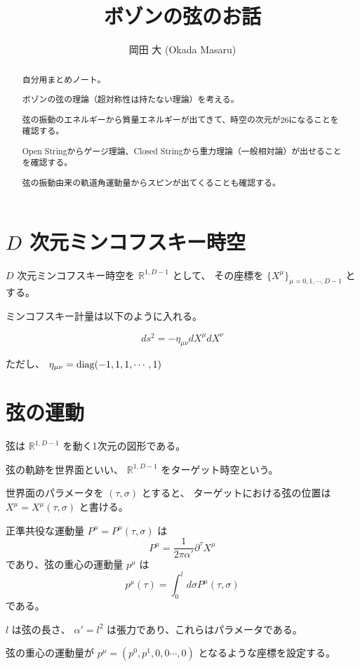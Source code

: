 \documentclass[uplatex]{jsarticle}
\title{
ボゾンの弦のお話
}
\author{
岡田 大 (Okada Masaru)
}
\begin{document}
\maketitle

\begin{abstract}
	自分用まとめノート。

	ボゾンの弦の理論（超対称性は持たない理論）を考える。

	弦の振動のエネルギーから質量エネルギーが出てきて、時空の次元が26になることを確認する。

	Open Stringからゲージ理論、Closed Stringから重力理論（一般相対論）が出せることを確認する。

	弦の振動由来の軌道角運動量からスピンが出てくることも確認する。

\end{abstract}

\section{$D$ 次元ミンコフスキー時空}

$D$ 次元ミンコフスキー時空を
$\mathbb{R}^{1,D-1}$
として、
その座標を
$\{ X^{\mu} \}_{\mu=0,1,\cdots,D-1}$
とする。

ミンコフスキー計量は以下のように入れる。

$$
	ds^{2} = - \eta_{\mu \nu} dX^{\mu} dX^{\nu}
$$


ただし、
$\eta_{\mu \nu} = {\rm diag} (-1, 1,1,\cdots,1)$

\section{弦の運動}

弦は
$\mathbb{R}^{1,D-1}$
を動く1次元の図形である。

弦の軌跡を世界面といい、
$\mathbb{R}^{1,D-1}$
をターゲット時空という。

世界面のパラメータを
$(\tau,\sigma)$
とすると、
ターゲットにおける弦の位置は
$X^{\mu}=X^{\mu}(\tau, \sigma)$
と書ける。

正準共役な運動量
$P^{\mu}=P^{\mu}(\tau, \sigma)$
は
$$
	P^{\mu}
	=
	\frac{1}{2 \pi \alpha'}
	\partial^{\tau} X^{\mu}
$$
であり、弦の重心の運動量
$p^{\mu}$
は
$$
	p^{\mu}(\tau)
	=
	\int^{l}_{0}
	d \sigma
	P^{\mu}(\tau, \sigma)
$$
である。

$l$
は弦の長さ、
$\alpha'=l^{2}$
は張力であり、これらはパラメータである。

弦の重心の運動量が
$p^{\mu} = (p^{0} , p^{1}, 0 , 0 \cdots, 0)$
となるような座標を設定する。
\end{document}
